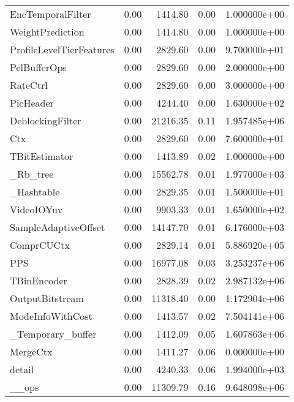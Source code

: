 \begin{tabular}{lrrrr}
EncTemporalFilter         &   0.00 &   1414.80 &      0.00 &  1.000000e+00 \\
WeightPrediction          &   0.00 &   1414.80 &      0.00 &  1.000000e+00 \\
ProfileLevelTierFeatures  &   0.00 &   2829.60 &      0.00 &  9.700000e+01 \\
PelBufferOps              &   0.00 &   2829.60 &      0.00 &  2.000000e+00 \\
RateCtrl                  &   0.00 &   2829.60 &      0.00 &  3.000000e+00 \\
PicHeader                 &   0.00 &   4244.40 &      0.00 &  1.630000e+02 \\
DeblockingFilter          &   0.00 &  21216.35 &      0.11 &  1.957485e+06 \\
Ctx                       &   0.00 &   2829.60 &      0.00 &  7.600000e+01 \\
TBitEstimator             &   0.00 &   1413.89 &      0.02 &  1.000000e+00 \\
\_Rb\_tree                  &   0.00 &  15562.78 &      0.01 &  1.977000e+03 \\
\_Hashtable                &   0.00 &   2829.35 &      0.01 &  1.500000e+01 \\
VideoIOYuv                &   0.00 &   9903.33 &      0.01 &  1.650000e+02 \\
SampleAdaptiveOffset      &   0.00 &  14147.70 &      0.01 &  6.176000e+03 \\
ComprCUCtx                &   0.00 &   2829.14 &      0.01 &  5.886920e+05 \\
PPS                       &   0.00 &  16977.08 &      0.03 &  3.253237e+06 \\
TBinEncoder               &   0.00 &   2828.39 &      0.02 &  2.987132e+06 \\
OutputBitstream           &   0.00 &  11318.40 &      0.00 &  1.172904e+06 \\
ModeInfoWithCost          &   0.00 &   1413.57 &      0.02 &  7.504141e+06 \\
\_Temporary\_buffer         &   0.00 &   1412.09 &      0.05 &  1.607863e+06 \\
MergeCtx                  &   0.00 &   1411.27 &      0.06 &  0.000000e+00 \\
detail                    &   0.00 &   4240.33 &      0.06 &  1.994000e+03 \\
\_\_ops                     &   0.00 &  11309.79 &      0.16 &  9.648098e+06 \\

\end{tabular}
